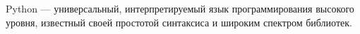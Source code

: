 Python — универсальный, интерпретируемый язык программирования высокого уровня, известный своей простотой синтаксиса и широким спектром библиотек.